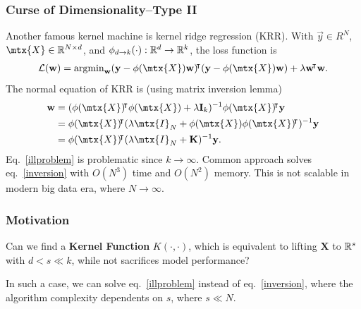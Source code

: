 \documentclass[10pt]{../formats/RU}
\begin{document}
\begin{frame}
  \frametitle{Curse of Dimensionality--Type II}
  Another famous kernel machine is kernel ridge regression (KRR). With $\vec{y}\in R^N$, $\mtx{X}\in\R^{N\times d}$, and $\phi_{d\rightarrow k}(\cdot):\mathbb{R}^d\rightarrow\mathbb{R}^k$, the loss function is
      \begin{align*}
        \mathcal{L}(\vec{w})=\argmin_{\vec{w}}(\vec{y}-\phi(\mtx{X})\vec{w})\trn(\vec{y}-\phi(\mtx{X})\vec{w}) + \lambda\vec{w}\trn\vec{w}.
      \end{align*}
    The normal equation of KRR is (using matrix inversion lemma)
    \begin{align}
      \vec{w} &= (\phi(\mtx{X})\trn\phi(\mtx{X})+\lambda\mathbf{I}_k)^{-1}\phi(\mtx{X})\trn\vec{y} \label{illproblem} \\
      &= \phi(\mtx{X})\trn(\lambda\mtx{I}_N+\phi(\mtx{X})\phi(\mtx{X})\trn)^{-1}\vec{y} \label{inversion}\\
      &= \phi(\mtx{X})\trn(\lambda\mtx{I}_N+\mathbf{K})^{-1}\vec{y}.
    \end{align}
    Eq.~\eqref{illproblem} is problematic since $k\rightarrow\infty$. Common approach solves eq.~\eqref{inversion} with $O(N^3)$ time and $O(N^2)$ memory. This is not scalable in modern big data era, where $N\rightarrow\infty$.
\end{frame}
\begin{frame}
  \frametitle{Motivation}
  Can we find a \textbf{Kernel Function} $K(\cdot, \cdot)$, which is equivalent to lifting $\mathbf{X}$ to $\mathbb{R}^s$ with $d < s\ll k$, while not sacrifices model performance?

  In such a case, we can solve eq.~\eqref{illproblem} instead of eq.~\eqref{inversion}, where the algorithm complexity dependents on $s$, where $s\ll N$.
\end{frame}
\end{document}
